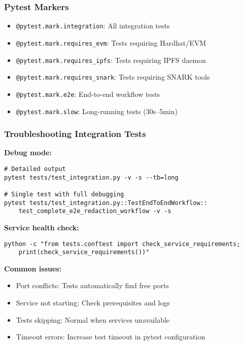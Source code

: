 \subsubsection{Pytest Markers}

\begin{itemize}
    \item \texttt{@pytest.mark.integration}: All integration tests
    \item \texttt{@pytest.mark.requires\_evm}: Tests requiring Hardhat/EVM
    \item \texttt{@pytest.mark.requires\_ipfs}: Tests requiring IPFS daemon
    \item \texttt{@pytest.mark.requires\_snark}: Tests requiring SNARK tools
    \item \texttt{@pytest.mark.e2e}: End-to-end workflow tests
    \item \texttt{@pytest.mark.slow}: Long-running tests (30s--5min)
\end{itemize}

\subsubsection{Troubleshooting Integration Tests}

\textbf{Debug mode:}
\begin{verbatim}
# Detailed output
pytest tests/test_integration.py -v -s --tb=long

# Single test with full debugging
pytest tests/test_integration.py::TestEndToEndWorkflow::
    test_complete_e2e_redaction_workflow -v -s
\end{verbatim}

\textbf{Service health check:}
\begin{verbatim}
python -c "from tests.conftest import check_service_requirements; 
    print(check_service_requirements())"
\end{verbatim}

\textbf{Common issues:}
\begin{itemize}
    \item Port conflicts: Tests automatically find free ports
    \item Service not starting: Check prerequisites and logs
    \item Tests skipping: Normal when services unavailable
    \item Timeout errors: Increase test timeout in pytest configuration
\end{itemize}
